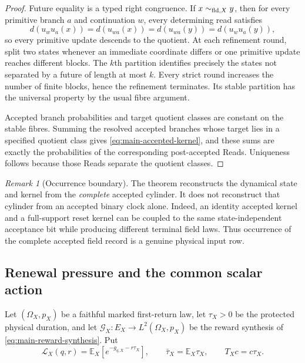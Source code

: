 \documentclass[11pt]{article}
\theoremstyle{definition}
\theoremstyle{remark}
\newtheorem{remark}[remark]{Remark}
\begin{document}
\begin{proof}
Future equality is a typed right congruence.  If $x\sim_{{\rm fld},X}y$, then
for every primitive branch $a$ and continuation $w$, every determining read
satisfies
\[
 d(u_wu_a(x))=d(u_{wa}(x))=d(u_{wa}(y))=d(u_wu_a(y)),
\]
so every primitive update descends to the quotient.  At each refinement round,
split two states whenever an immediate coordinate differs or one primitive
update reaches different blocks.  The $k$th partition identifies precisely the
states not separated by a future of length at most $k$.  Every strict round
increases the number of finite blocks, hence the refinement terminates.  Its
stable partition has the universal property by the usual fibre argument.

Accepted branch probabilities and target quotient classes are constant on the
stable fibres.  Summing the resolved accepted branches whose target lies in a
specified quotient class gives \eqref{eq:main-accepted-kernel}, and these sums
are exactly the probabilities of the corresponding post-accepted Reads.
Uniqueness follows because those Reads separate the quotient classes.
\end{proof}

\begin{remark}[Occurrence boundary]
The theorem reconstructs the dynamical state and kernel from the \emph{complete}
accepted cylinder.  It does not reconstruct that cylinder from an accepted
binary clock alone.  Indeed, an identity accepted kernel and a full-support
reset kernel can be coupled to the same state-independent acceptance bit while
producing different terminal field laws.  Thus occurrence of the complete
accepted field record is a genuine physical input row.
\end{remark}

\subsection{Renewal pressure and the common scalar action}

Let $(\Omega_X,p_X)$ be a faithful marked first-return law, let
$\tau_X>0$ be the protected physical duration, and let
$\mathscr G_X:E_X\to L^2(\Omega_X,p_X)$ be the reward synthesis of
\eqref{eq:main-reward-synthesis}.  Put
\[
 \mathcal L_X(q,r)=\mathbb E_X[e^{-g_{q,X}-r\tau_X}],
 \qquad
 \bar\tau_X=\mathbb E_X\tau_X,
 \qquad
 T_Xc=c\tau_X.
\]
\end{document}
